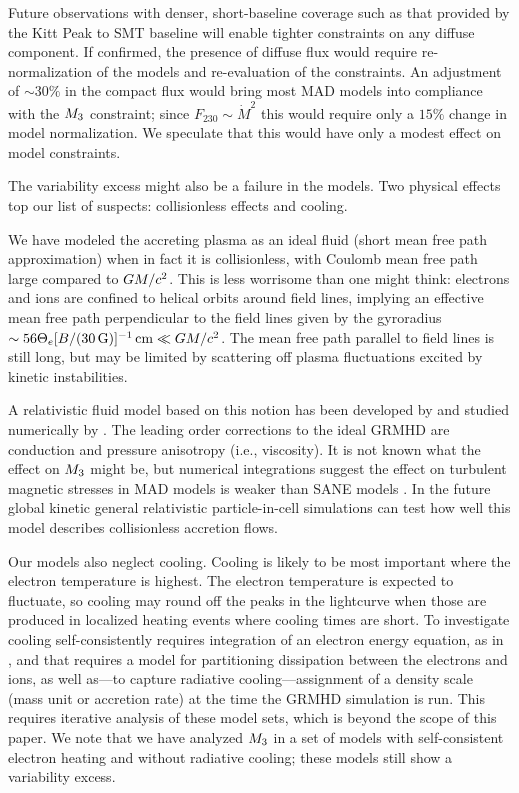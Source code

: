 Future observations with denser, short-baseline coverage such as that provided by the Kitt Peak to SMT baseline will enable tighter constraints on any diffuse component.  If confirmed, the presence of diffuse flux would require re-normalization of the models and re-evaluation of the constraints.  An adjustment of $\sim 30\%$ in the compact flux would bring most MAD models into compliance with the $M_{3}$ constraint; since $F_{230} \sim \dot{M}^2$ this would require only a $15\%$ change in model normalization.  We speculate that this would have only a modest effect on model constraints.

The variability excess might also be a failure in the models.  Two physical effects top our list of suspects: collisionless effects and cooling.

We have modeled the accreting plasma as an ideal fluid (short mean free path approximation) when in fact it is collisionless, with Coulomb mean free path large compared to $GM/c^2$.  This is less worrisome than one might think: electrons and ions are confined to helical orbits around field lines, implying an effective mean free path perpendicular to the field lines given by the gyroradius $\sim 56 \Theta_e [B/(30\,\mathrm{G})]^{-1} \,\mathrm{cm} \ll GM/c^2$.  The mean free path parallel to field lines is still long, but may be limited by scattering off plasma fluctuations excited by kinetic instabilities.

A relativistic fluid model based on this notion has been developed by \citet{2015ApJ...810..162C} and studied numerically by \citet{2017MNRAS.470.2240F}.  The leading order corrections to the ideal GRMHD are conduction and pressure anisotropy (i.e., viscosity).  It is not known what the effect on $M_{3}$ might be, but numerical integrations suggest the effect on turbulent magnetic stresses in MAD models is weaker than SANE models \citep{2017MNRAS.470.2240F}. In the future global kinetic general relativistic particle-in-cell simulations can test how well this model describes collisionless accretion flows.

Our models also neglect cooling.  Cooling is likely to be most important where the electron temperature is highest. The electron temperature is expected to fluctuate, so cooling may round off the peaks in the lightcurve when those are produced in localized heating events where cooling times are short.  To investigate cooling self-consistently requires integration of an electron energy equation, as in \cite{2015MNRAS.454.1848R}, and that requires a model for partitioning dissipation between the electrons and ions, as well as---to capture radiative cooling---assignment of a density scale (mass unit or accretion rate) at the time the GRMHD simulation is run.  This requires iterative analysis of these model sets, which is beyond the scope of this paper.  We note that we have analyzed $M_{3}$ in a set of models with self-consistent electron heating and without radiative cooling; these models still show a variability excess.

